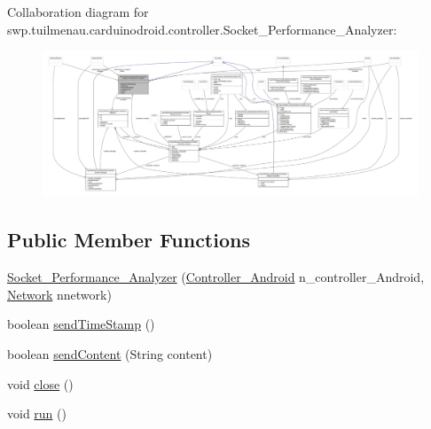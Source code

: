 Collaboration diagram for swp.\+tuilmenau.\+carduinodroid.\+controller.\+Socket\+\_\+\+Performance\+\_\+\+Analyzer\+:
\nopagebreak
\begin{figure}[H]
\begin{center}
\leavevmode
\includegraphics[width=350pt]{classswp_1_1tuilmenau_1_1carduinodroid_1_1controller_1_1_socket___performance___analyzer__coll__graph}
\end{center}
\end{figure}
\subsection*{Public Member Functions}
\begin{DoxyCompactItemize}
\item 
\hyperlink{classswp_1_1tuilmenau_1_1carduinodroid_1_1controller_1_1_socket___performance___analyzer_ad8b07b2fa1ef425a0799534eac638e2c}{Socket\+\_\+\+Performance\+\_\+\+Analyzer} (\hyperlink{classswp_1_1tuilmenau_1_1carduinodroid_1_1controller_1_1_controller___android}{Controller\+\_\+\+Android} n\+\_\+controller\+\_\+\+Android, \hyperlink{classswp_1_1tuilmenau_1_1carduinodroid_1_1controller_1_1_network}{Network} nnetwork)
\item 
boolean \hyperlink{classswp_1_1tuilmenau_1_1carduinodroid_1_1controller_1_1_socket___performance___analyzer_a7cb9ff89df5010aada87f12106ae780f}{send\+Time\+Stamp} ()
\item 
boolean \hyperlink{classswp_1_1tuilmenau_1_1carduinodroid_1_1controller_1_1_socket___performance___analyzer_a978fc027e3ba8daba45d97ec3b4e01a7}{send\+Content} (String content)
\item 
void \hyperlink{classswp_1_1tuilmenau_1_1carduinodroid_1_1controller_1_1_socket___performance___analyzer_a268ebda216316321db775f2b7dc3459b}{close} ()
\item 
void \hyperlink{classswp_1_1tuilmenau_1_1carduinodroid_1_1controller_1_1_socket___performance___analyzer_a53e5cd2c2f619c2d651b7d9dfea11e7a}{run} ()
\end{DoxyCompactItemize}


